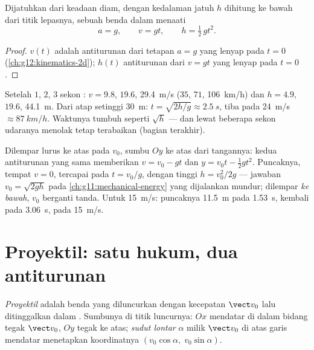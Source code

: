 \begin{proposition}\label{prop:g12:projectile-motion:vertical}
Dijatuhkan dari keadaan diam, dengan kedalaman jatuh $h$ dihitung ke bawah
dari titik lepasnya, sebuah benda dalam  menaati
\[
a = g, \qquad v = g t, \qquad h = \tfrac12\, g t^2 .
\]
\end{proposition}

\begin{proof}
$v(t)$ adalah antiturunan dari tetapan $a = g$ yang lenyap pada $t = 0$
(\cref{ch:g12:kinematics-2d}); $h(t)$ antiturunan dari $v = gt$ yang lenyap pada $t = 0$.
\end{proof}

\begin{example}\label{ex:g12:projectile-motion:orders}
Setelah $1$, $2$, $3$ sekon : $v = 9.8$, $19.6$, \qty{29.4}{m/s}
($35$, $71$, \qty{106}{km/h}) dan $h = 4.9$, $19.6$, \qty{44.1}{m}. Dari
atap setinggi \qty{30}{m}: $t = \sqrt{2h/g} \approx \qty{2.5}{s}$, tiba pada
\qty{24}{m/s} $\approx \qty{87}{km/h}$. Waktunya tumbuh seperti $\sqrt h$ ---
dan lewat beberapa sekon udaranya menolak tetap terabaikan (bagian terakhir).
\end{example}

\begin{example}\label{ex:g12:projectile-motion:throw}
Dilempar lurus ke atas pada $v_0$, sumbu $Oy$ ke atas dari tangannya: kedua
antiturunan yang sama memberikan $v = v_0 - gt$ dan $y = v_0 t - \tfrac12 gt^2$.
Puncaknya, tempat $v = 0$, tercapai pada $t = v_0/g$, dengan tinggi
$h = v_0^2/2g$ --- jawaban  $v_0 = \sqrt{2gh}$ pada
\cref{ch:g11:mechanical-energy} yang dijalankan mundur; dilempar \emph{ke
bawah}, $v_0$ berganti tanda. Untuk \qty{15}{m/s}: puncaknya
\qty{11.5}{m} pada \qty{1.53}{s}, kembali pada \qty{3.06}{s}, pada \qty{15}{m/s}.
\end{example}

\section{Proyektil: satu hukum, dua antiturunan}

\begin{definition}[Proyektil]\label{def:g12:projectile-motion:projectile}
\emph{Proyektil} adalah benda yang diluncurkan dengan
kecepatan $\vect v_0$ lalu ditinggalkan dalam . Sumbunya di titik
luncurnya: $Ox$ mendatar di dalam bidang tegak $\vect v_0$, $Oy$ tegak ke
atas; \emph{sudut lontar} $\alpha$ milik $\vect v_0$ di
atas garis mendatar menetapkan koordinatnya $(v_0\cos\alpha,\; v_0\sin\alpha)$.
\end{definition}

